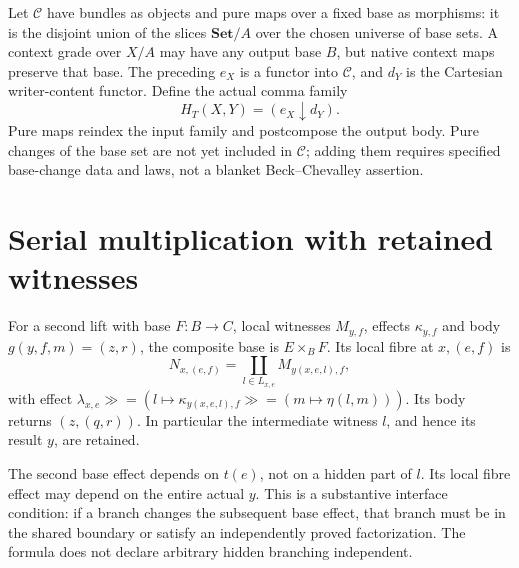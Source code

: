 \documentclass[11pt]{article}
\begin{document}
Let $\mathcal C$ have bundles as objects and pure maps over a fixed base as morphisms: it is the disjoint union of the slices $\mathbf{Set}/A$ over the chosen universe of base sets. A context grade over $X/A$ may have any output base $B$, but native context maps preserve that base. The preceding $e_X$ is a functor into $\mathcal C$, and $d_Y$ is the Cartesian writer-content functor. Define the actual comma family
\[
 H_T(X,Y)=(e_X\downarrow d_Y).
\]
Pure maps reindex the input family and postcompose the output body. Pure changes of the base set are not yet included in $\mathcal C$; adding them requires specified base-change data and laws, not a blanket Beck--Chevalley assertion.

\section{Serial multiplication with retained witnesses}
For a second lift with base $F:B\to C$, local witnesses $M_{y,f}$, effects $\kappa_{y,f}$ and body $g(y,f,m)=(z,r)$, the composite base is $E\times_B F$. Its local fibre at $x,(e,f)$ is
\[
 N_{x,(e,f)}=\coprod_{l\in L_{x,e}}M_{y(x,e,l),f},
\]
with effect $\lambda_{x,e}\gg=(l\mapsto\kappa_{y(x,e,l),f}\gg=(m\mapsto\eta(l,m)))$. Its body returns $(z,(q,r))$. In particular the intermediate witness $l$, and hence its result $y$, are retained.

The second base effect depends on $t(e)$, not on a hidden part of $l$. Its local fibre effect may depend on the entire actual $y$. This is a substantive interface condition: if a branch changes the subsequent base effect, that branch must be in the shared boundary or satisfy an independently proved factorization. The formula does not declare arbitrary hidden branching independent.
\end{document}
